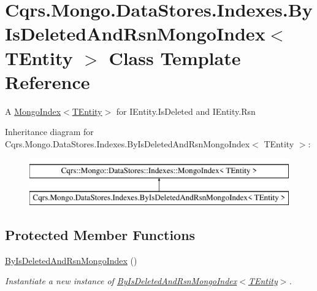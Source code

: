 \hypertarget{classCqrs_1_1Mongo_1_1DataStores_1_1Indexes_1_1ByIsDeletedAndRsnMongoIndex}{}\section{Cqrs.\+Mongo.\+Data\+Stores.\+Indexes.\+By\+Is\+Deleted\+And\+Rsn\+Mongo\+Index$<$ T\+Entity $>$ Class Template Reference}
\label{classCqrs_1_1Mongo_1_1DataStores_1_1Indexes_1_1ByIsDeletedAndRsnMongoIndex}


A \hyperlink{classCqrs_1_1Mongo_1_1DataStores_1_1Indexes_1_1MongoIndex_a7affbb063520cd8c8bda27f8478efd06_a7affbb063520cd8c8bda27f8478efd06}{Mongo\+Index$<$\+T\+Entity$>$} for I\+Entity.\+Is\+Deleted and I\+Entity.\+Rsn  


Inheritance diagram for Cqrs.\+Mongo.\+Data\+Stores.\+Indexes.\+By\+Is\+Deleted\+And\+Rsn\+Mongo\+Index$<$ T\+Entity $>$\+:\begin{figure}[H]
\begin{center}
\leavevmode
\includegraphics[height=2.000000cm]{classCqrs_1_1Mongo_1_1DataStores_1_1Indexes_1_1ByIsDeletedAndRsnMongoIndex}
\end{center}
\end{figure}
\subsection*{Protected Member Functions}
\begin{DoxyCompactItemize}
\item 
\hyperlink{classCqrs_1_1Mongo_1_1DataStores_1_1Indexes_1_1ByIsDeletedAndRsnMongoIndex_ac8d7d3e7eadc2080041196f33e878da2_ac8d7d3e7eadc2080041196f33e878da2}{By\+Is\+Deleted\+And\+Rsn\+Mongo\+Index} ()
\begin{DoxyCompactList}\small\item\em Instantiate a new instance of \hyperlink{classCqrs_1_1Mongo_1_1DataStores_1_1Indexes_1_1ByIsDeletedAndRsnMongoIndex_ac8d7d3e7eadc2080041196f33e878da2_ac8d7d3e7eadc2080041196f33e878da2}{By\+Is\+Deleted\+And\+Rsn\+Mongo\+Index$<$\+T\+Entity$>$}. \end{DoxyCompactList}\end{DoxyCompactItemize}
